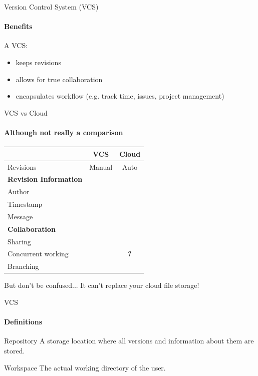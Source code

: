 \documentclass{beamer}
\newcommand{\cmark}{\ding{51}}%
\newcommand{\xmark}{\ding{55}}%
\begin{document}
\begin{frame}{Version Control System (VCS)}
\framesubtitle{Benefits}

A VCS:
\begin{itemize}
	\item keeps \alert{revisions}
	\item allows for \alert{true collaboration}
	\item encapsulates \alert{workflow} (e.g. track time, issues, project management)
\end{itemize}

\end{frame}

\begin{frame}{VCS vs Cloud}
\framesubtitle{Although not really a comparison}

\begin{table}[!b]
	{\carlitoTLF %
		\begin{tabularx}{\textwidth}{Xcc}
			& \textbf{VCS} & \textbf{Cloud} \\
			\toprule
			Revisions & Manual & Auto \\
			\textbf{Revision Information} \\
			Author & \cmark & \cmark \\
			Timestamp & \cmark & \cmark \\
			Message & \cmark & \alert{\xmark} \\
			\textbf{Collaboration} \\
			Sharing & \cmark & \cmark \\
			Concurrent working & \cmark & \alert{\textbf{?}} \\
			Branching & \cmark & \alert{\xmark} \\
			\bottomrule
	\end{tabularx}}
\end{table}

But don't be confused... It can't replace your cloud file storage!
\end{frame}

    \begin{frame}{VCS}
    \framesubtitle{Definitions}
    
    \begin{block}{Repository}
    	A storage location where all versions and information about them are stored.
    \end{block}

	\begin{block}{Workspace}
		The actual working directory of the user.
	\end{block}
\end{frame}
\end{document}
